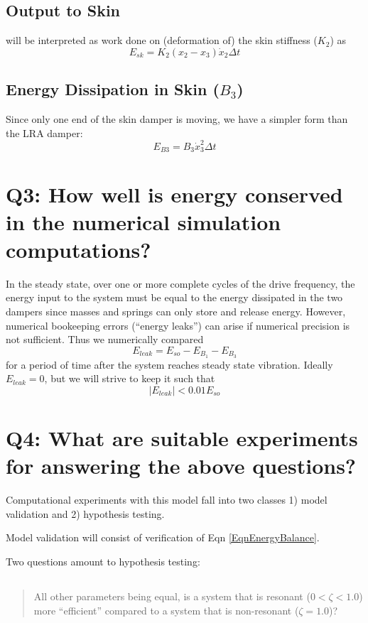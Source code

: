 \documentclass[letterpaper,11pt]{article}
\begin{document}
\subsection{Output to Skin} will be interpreted as  work done on
    (deformation of) the skin stiffness ($K_2$) as
    \[
    E_{sk} = K_2(x_2-x_3)\dot{x}_2 \Delta t
    \]

\subsection{Energy Dissipation in Skin ($B_3$)}
    Since only one end of the skin damper is moving, we have a simpler form than the LRA damper:
    \[
    E_{B3} = B_3\dot{x}_3^2\Delta t
    \]


\section{Q3: How well is energy conserved in the numerical simulation computations?}

In the steady state, over one or more complete cycles of the drive frequency,
the energy input to the system must be equal to the energy dissipated in the two
dampers since masses and springs can only store and release energy.  However, numerical bookeeping
errors (``energy leaks'') can arise if numerical precision is not sufficient.  Thus we
numerically compared
\[
E_{leak} = E_{so} - E_{B_1} - E_{B_3}
\]
for a period of time after the system reaches steady state vibration. Ideally $E_{leak}=0$, but we will
strive to keep it such that
\begin{equation}\label{EqnEnergyBalance}
|E_{leak}| < 0.01 E_{so}
\end{equation}


\section{Q4: What are suitable experiments for answering the above questions?}

Computational experiments with this model fall into two classes 1) model validation and 2)
hypothesis testing.

Model validation will consist of verification of Eqn \ref{EqnEnergyBalance}.

Two questions amount to hypothesis testing:
\subsection{}\label{ResQ1}
\begin{quotation}  All other parameters being equal, is a system that is resonant ($0<\zeta<1.0$) more ``efficient''
compared to a system that is non-resonant ($\zeta=1.0$)?
\end{quotation}
\end{document}
